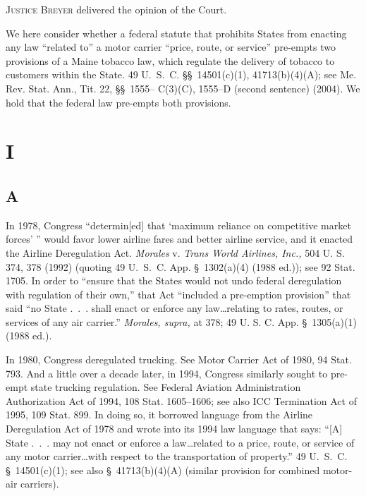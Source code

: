 
\setcounter{page}{367}

  \textsc{Justice Breyer} delivered the opinion of the Court.

  We here consider whether a federal statute that prohibits States from
enacting any law ``related to'' a motor carrier ``price, route,
or service'' pre-empts two provisions of a Maine tobacco law, which
regulate the delivery of tobacco to customers within the State. 49
U.~S.~C. \S\S~14501(c)(1), 41713(b)(4)(A); see Me. Rev. Stat. Ann.,
Tit. 22, \S\S~1555-- C(3)(C), 1555--D (second sentence) (2004). We
hold that the federal law pre-empts both provisions.

\section{I}

\subsection{A}

  In 1978, Congress ``determin[ed] that ‘maximum reliance on
competitive market forces' '' would favor lower airline fares
and better airline service, and it enacted the Airline \newpage 
Deregulation Act. \emph{Morales} v. \emph{Trans World Airlines, Inc.,} 504
U. S. 374, 378 (1992) (quoting 49 U.~S.~C. App. \S~1302(a)(4) (1988
ed.)); see 92 Stat. 1705. In order to ``ensure that the States would
not undo federal deregulation with regulation of their own,'' that Act
``included a pre-emption provision'' that said ``no State .~.~.
shall enact or enforce any law\dots relating to rates, routes, or
services of any air carrier.'' \emph{Morales, supra,} at 378; 49 U. S.
C. App. \S~1305(a)(1) (1988 ed.).

  In 1980, Congress deregulated trucking. See Motor Carrier Act
of 1980, 94 Stat. 793. And a little over a decade later, in 1994,
Congress similarly sought to pre-empt state trucking regulation. See
Federal Aviation Administration Authorization Act of 1994, 108 Stat.
1605--1606; see also ICC Termination Act of 1995, 109 Stat. 899.
In doing so, it borrowed language from the Airline Deregulation Act
of 1978 and wrote into its 1994 law language that says: ``[A] State
.~.~. may not enact or enforce a law\dots related to a price,
route, or service of any motor carrier\dots with respect to the
transportation of property.'' 49 U.~S.~C. \S~14501(c)(1); see
also \S~41713(b)(4)(A) (similar provision for combined motor-air
carriers).

